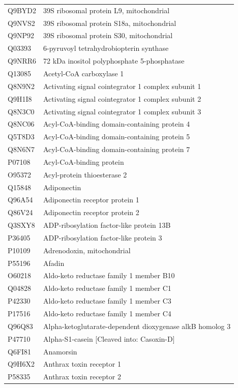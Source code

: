 \documentclass[10pt,twoside]{article}
\begin{document}
\begin{longtable}{lL{0.75\textwidth}}
Q9BYD2	&	39S ribosomal protein L9, mitochondrial 	\\
Q9NVS2	&	39S ribosomal protein S18a, mitochondrial 	\\
Q9NP92	&	39S ribosomal protein S30, mitochondrial 	\\
Q03393	&	6-pyruvoyl tetrahydrobiopterin synthase 	\\
Q9NRR6	&	72 kDa inositol polyphosphate 5-phosphatase 	\\
Q13085	&	Acetyl-CoA carboxylase 1 	\\
Q8N9N2	&	Activating signal cointegrator 1 complex subunit 1 	\\
Q9H1I8	&	Activating signal cointegrator 1 complex subunit 2 	\\
Q8N3C0	&	Activating signal cointegrator 1 complex subunit 3 	\\
Q8NC06	&	Acyl-CoA-binding domain-containing protein 4	\\
Q5T8D3	&	Acyl-CoA-binding domain-containing protein 5	\\
Q8N6N7	&	Acyl-CoA-binding domain-containing protein 7	\\
P07108	&	Acyl-CoA-binding protein 	\\
O95372	&	Acyl-protein thioesterase 2 	\\
Q15848	&	Adiponectin 	\\
Q96A54	&	Adiponectin receptor protein 1 	\\
Q86V24	&	Adiponectin receptor protein 2 	\\
Q3SXY8	&	ADP-ribosylation factor-like protein 13B 	\\
P36405	&	ADP-ribosylation factor-like protein 3	\\
P10109	&	Adrenodoxin, mitochondrial 	\\
P55196	&	Afadin 	\\
O60218	&	Aldo-keto reductase family 1 member B10 	\\
Q04828	&	Aldo-keto reductase family 1 member C1 	\\
P42330	&	Aldo-keto reductase family 1 member C3 	\\
P17516	&	Aldo-keto reductase family 1 member C4 	\\
Q96Q83	&	Alpha-ketoglutarate-dependent dioxygenase alkB homolog 3 	\\
P47710	&	Alpha-S1-casein [Cleaved into: Casoxin-D]	\\
Q6FI81	&	Anamorsin 	\\
Q9H6X2	&	Anthrax toxin receptor 1 	\\
P58335	&	Anthrax toxin receptor 2 	\\

\end{longtable}
\end{document}
